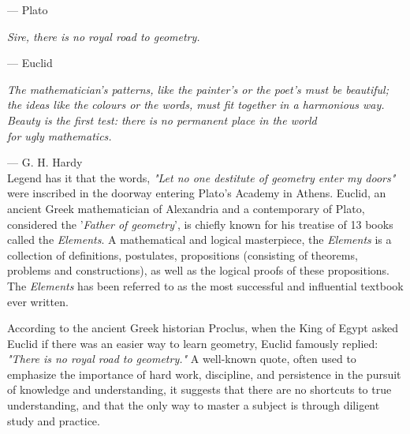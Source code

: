\documentclass[twoside,11pt]{report}
\begin{document}
\hspace{16em} --- Plato

\hfill

\begin{center}
  \textit{Sire, there is no royal road to geometry.}

  \hspace{10.5em}--- Euclid
\end{center}

\hfill

\begin{flushright}
  \textit{The mathematician's patterns, like the painter's or the poet's must be beautiful;}
  \textit{the ideas like the colours or the words, must fit together in a harmonious way.}
  \textit{Beauty is the first test: there is no permanent place in the world}\\
  \textit{for ugly mathematics.}
\end{flushright}

\hfill --- G. H. Hardy\\

Legend has it that the words, \textit{"Let no one destitute of geometry enter my doors"} were inscribed in the doorway entering Plato's Academy in Athens.  Euclid, an ancient Greek mathematician of Alexandria and a contemporary of Plato, considered the '\textit{Father of geometry}', is chiefly known for his treatise of 13 books called the \textit{Elements}.  A mathematical and logical masterpiece, the \textit{Elements} is a collection of definitions, postulates, propositions (consisting of theorems, problems and constructions), as well as the logical proofs of these propositions.  The \textit{Elements} has been referred to as the most successful and influential textbook ever written.

According to the ancient Greek historian Proclus, when the King of Egypt asked Euclid if there was an easier way to learn geometry, Euclid famously replied: \textit{"There is no royal road to geometry."} A well-known quote, often used to emphasize the importance of hard work, discipline, and persistence in the pursuit of knowledge and understanding, it suggests that there are no shortcuts to true understanding, and that the only way to master a subject is through diligent study and practice.
\end{document}
